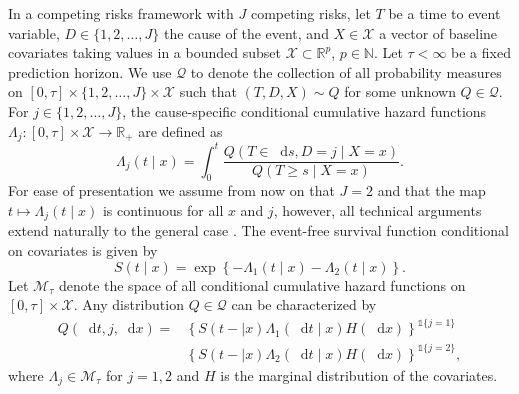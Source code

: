 \documentclass[alpha-refs]{wiley-article}
\newcommand{\R}{\mathbb{R}}
\newcommand{\N}{\mathbb{N}}
\newcommand*\diff{\mathop{}\!\mathrm{d}}
\newcommand{\1}{\mathbb{1}}
\begin{document}
In a competing risks framework \citep{andersen2012statistical} with
\(J\) competing risks, let \( T\) be a time to event variable,
\(D\in\{1,2,\dots,J\}\) the cause of the event, and $X \in
\mathcal{X}$ a vector of baseline covariates taking values in a
bounded subset \( \mathcal{X} \subset \R^p \), \( p\in\N \). Let
$\tau< \infty$ be a fixed prediction horizon. We use \(\mathcal{Q} \)
to denote the collection of all probability measures on \( [0,\tau]
\times \{1,2,\dots,J\}\times \mathcal{X} \) such that \( (T, D, X) \sim Q \)
for some unknown \( Q \in \mathcal{Q} \). For \(j\in\{1,2,
\dots,J\}\), the cause-specific conditional cumulative hazard
functions \( \Lambda_{j} \colon [0, \tau] \times \mathcal{X}
\rightarrow \R_+ \) are defined as
\begin{equation*}
  \Lambda_{j}(t \mid x) = \int_0^t\frac{  Q(T \in \diff s, D=j \mid X=x )}{Q(T \geq s \mid X=x )}.
\end{equation*} For ease of presentation we assume from now on that
\(J=2\) and that the map \( t\mapsto \Lambda_j(t \mid x) \) is
continuous for all \( x \) and \( j \), however, all technical
arguments extend naturally to the general case
\citep{andersen2012statistical}.  The event-free survival function
conditional on covariates is given by
\begin{equation}
  \label{eq:surv-def}
  S(t \mid x)=\exp\left\{-\Lambda_{1}(t \mid x)-\Lambda_{2}(t \mid x)\right\}.
\end{equation}
Let \( \mathcal{M}_{\tau}\) denote the space of all conditional
cumulative hazard functions on \( [0,\tau] \times\mathcal{X}\). Any
distribution \( Q \in \mathcal{Q} \) can be characterized by
\begin{equation*}
  \label{eq:parametrizeQ}
  \begin{split}
    Q(\diff t,j,\diff x)=& \left\{S(t- \mid x)\Lambda_1(\diff t \mid x)H(\diff x)\right\}^{\1{\{j=1\}}}\\
                         &  \left\{S(t- \mid x)\Lambda_2(\diff t \mid x)H(\diff x)\right\}^{\1{\{j=2\}}},
  \end{split}
\end{equation*}
where \(\Lambda_{j} \in \mathcal{M}_{\tau}\) for \(j=1,2\) and \(H\) is the marginal
distribution of the covariates.
\end{document}
